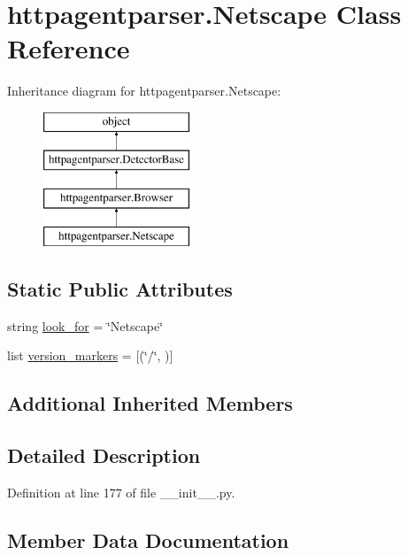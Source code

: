 \hypertarget{classhttpagentparser_1_1_netscape}{}\section{httpagentparser.\+Netscape Class Reference}
\label{classhttpagentparser_1_1_netscape}
Inheritance diagram for httpagentparser.\+Netscape\+:\begin{figure}[H]
\begin{center}
\leavevmode
\includegraphics[height=4.000000cm]{classhttpagentparser_1_1_netscape}
\end{center}
\end{figure}
\subsection*{Static Public Attributes}
\begin{DoxyCompactItemize}
\item 
string \hyperlink{classhttpagentparser_1_1_netscape_ae8c66fe7a2a1d8ac10dfb508c64c47b9}{look\+\_\+for} = \char`\"{}Netscape\char`\"{}
\item 
list \hyperlink{classhttpagentparser_1_1_netscape_a238dc027567228bbfc3895a5f7b2d548}{version\+\_\+markers} = \mbox{[}(\char`\"{}/\char`\"{}, \textquotesingle{}\textquotesingle{})\mbox{]}
\end{DoxyCompactItemize}
\subsection*{Additional Inherited Members}


\subsection{Detailed Description}


Definition at line 177 of file \+\_\+\+\_\+init\+\_\+\+\_\+.\+py.



\subsection{Member Data Documentation}
\hypertarget{classhttpagentparser_1_1_netscape_ae8c66fe7a2a1d8ac10dfb508c64c47b9}{}\label{classhttpagentparser_1_1_netscape_ae8c66fe7a2a1d8ac10dfb508c64c47b9} 
